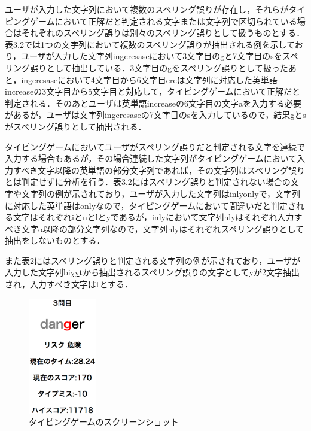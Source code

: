 \documentclass{jarticle}
\begin{document}
ユーザが入力した文字列において複数のスペリング誤りが存在し，それらがタイピングゲームにおいて正解だと判定される文字または文字列で区切られている場合はそれぞれのスペリング誤りは別々のスペリング誤りとして扱うものとする．表3.2では1つの文字列において複数のスペリング誤りが抽出される例を示しており，ユーザが入力した文字列in\underline{g}cre\underline{s}aseにおいて3文字目のgと7文字目のsをスペリング誤りとして抽出している．3文字目のgをスペリング誤りとして扱ったあと，ingcresaseにおいて4文字目から6文字目creは文字列に対応した英単語increaseの3文字目から5文字目と対応して，タイピングゲームにおいて正解だと判定される．そのあとユーザは英単語increaseの6文字目の文字aを入力する必要があるが，ユーザは文字列ingcresaseの7文字目のsを入力しているので，結果gとsがスペリング誤りとして抽出される．

タイピングゲームにおいてユーザがスペリング誤りだと判定される文字を連続で入力する場合もあるが，その場合連続した文字列がタイピングゲームにおいて入力すべき文字以降の英単語の部分文字列であれば，その文字列はスペリング誤りとは判定せずに分析を行う．表3.2にはスペリング誤りと判定されない場合の文字や文字列の例が示されており，ユーザが入力した文字列は\underline{inly}onlyで，文字列に対応した英単語はonlyなので，タイピングゲームにおいて間違いだと判定される文字はそれぞれiとnとlとyであるが，inlyにおいて文字列nlyはそれぞれ入力すべき文字o以降の部分文字列なので，文字列nlyはそれぞれスペリング誤りとして抽出をしないものとする．

また表2にはスペリング誤りと判定される文字列の例が示されており，ユーザが入力した文字列bi\underline{yy}tから抽出されるスペリング誤りの文字としてyが2文字抽出され，入力すべき文字はtとする．

\begin{figure}[t]
	\centering
		\includegraphics[width=3cm]{game2.png}
		\caption{タイピングゲームのスクリーンショット}
		\label{LabelExa}
\end{figure}
\end{document}
